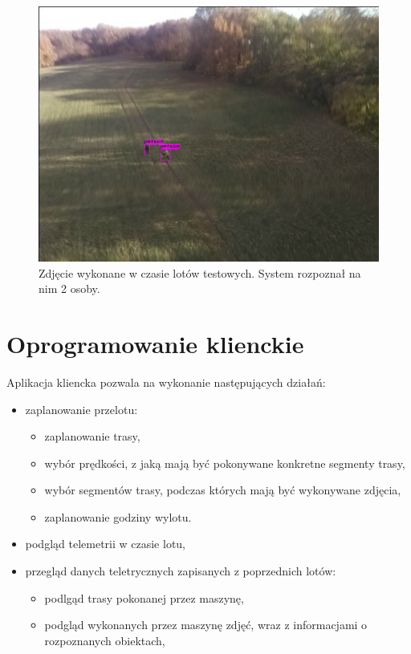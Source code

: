 \begin{figure}[H]
	\centering
\includegraphics[width=.7\linewidth]{rys03/rozpoznane_yolo.jpg}
	\caption{ Zdjęcie wykonane w czasie lotów testowych. System rozpoznał na nim 2 osoby.}
	\label{fig:stronaTytulowa}
\end{figure}

\section{Oprogramowanie klienckie}

Aplikacja kliencka pozwala na wykonanie następujących działań:

\begin{itemize}
	\item zaplanowanie przelotu:
	\begin{itemize}
		\item zaplanowanie trasy,
		\item wybór prędkości, z jaką mają być pokonywane konkretne segmenty trasy,
		\item wybór segmentów trasy, podczas których mają być wykonywane zdjęcia,
		\item zaplanowanie godziny wylotu.
	\end{itemize}
	\item podgląd telemetrii w czasie lotu,
	\item przegląd danych teletrycznych zapisanych z poprzednich lotów:
	\begin{itemize}
		\item podlgąd trasy pokonanej przez maszynę,
		\item podgląd wykonanych przez maszynę zdjęć,
				wraz z informacjami o rozpoznanych obiektach,
	\end{itemize} 
\end{itemize}

